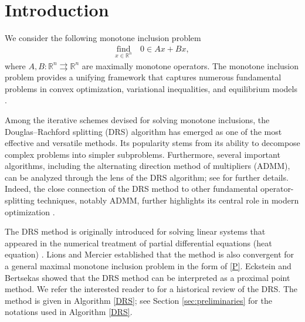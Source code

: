 \documentclass[ijoc,sglanonrev]{informs4}
\begin{document}




\maketitle
\thispagestyle{plain}


\section{Introduction}
\label{sec:intro}
We consider the following monotone inclusion problem 
\begin{align}\label{P}
\underset{x\in\mathbb{R}^n}{\text{find}}\quad 0\in Ax+Bx,
\end{align}
where $A, B : \mathbb{R}^n \rightrightarrows \mathbb{R}^n$ are maximally monotone operators.
The monotone inclusion problem  provides a unifying framework that captures numerous fundamental problems in convex optimization, variational inequalities,  and equilibrium models \cite{bauschke2017, combettes2018monotone,ryu2022large}.

Among the iterative schemes devised for solving monotone inclusions, the Douglas–Rachford splitting (DRS) algorithm \cite{combettes2018monotone} has emerged as one of the most effective and versatile methods. Its popularity stems from its ability to decompose complex problems into simpler subproblems.
Furthermore, several important algorithms, including the alternating direction method of multipliers (ADMM), can be analyzed through the lens of the DRS algorithm; see \cite[Chapter 3]{ryu2022large} for further details. Indeed, the close connection of the DRS method to other fundamental operator-splitting techniques, notably ADMM, further highlights its central role in modern optimization \cite{ryu2022large}.

The DRS method is originally introduced for solving linear systems that appeared in the numerical treatment of partial differential equations  (heat equation) \cite{douglas1956numerical}.  
Lions and Mercier \cite{lions1979splitting} established that the method is also convergent for a general maximal monotone inclusion problem in the form of \eqref{P}. Eckstein and Bertsekas \cite{eckstein1992douglas} showed that the DRS method can be interpreted as a proximal point method.  We refer the interested reader to \cite{glowinski2017splitting} for a historical review of the DRS. The method is given in Algorithm \ref{DRS}; see Section \ref{sec:preliminaries} for the notations used in Algorithm \ref{DRS}. 
\end{document}
